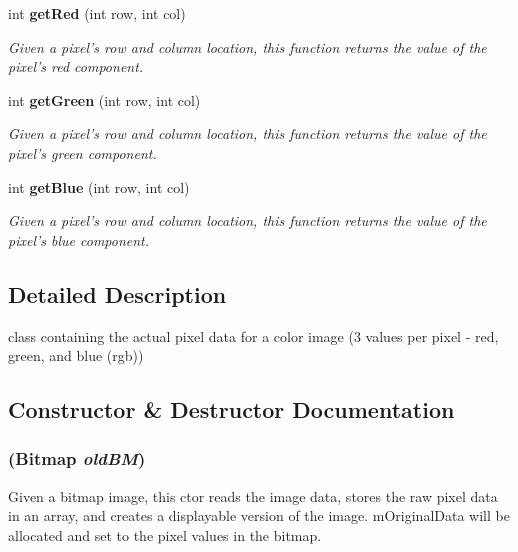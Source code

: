\begin{CompactItemize}
int {\bf get\-Red} (int row, int col)
\begin{CompactList}\small\item\em Given a pixel's row and column location, this function returns the value of the pixel's red component. \item\end{CompactList}\item 
int {\bf get\-Green} (int row, int col)
\begin{CompactList}\small\item\em Given a pixel's row and column location, this function returns the value of the pixel's green component. \item\end{CompactList}\item 
int {\bf get\-Blue} (int row, int col)
\begin{CompactList}\small\item\em Given a pixel's row and column location, this function returns the value of the pixel's blue component. \item\end{CompactList}\end{CompactItemize}


\subsection{Detailed Description}
class containing the actual pixel data for a color image (3 values per pixel - red, green, and blue (rgb)) 



\subsection{Constructor \& Destructor Documentation}
\subsubsection{ (Bitmap {\em old\-BM})}\label{class_c_s_image_viewer_1_1_color_image_data_f8056c730cb6b923376592834303e1b5}


Given a bitmap image, this ctor reads the image data, stores the raw pixel data in an array, and creates a displayable version of the image. m\-Original\-Data will be allocated and set to the pixel values in the bitmap. 

